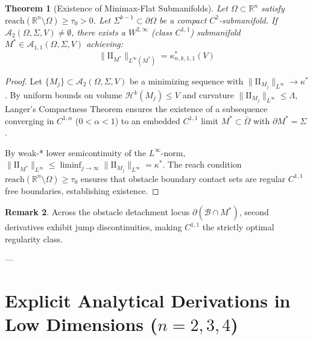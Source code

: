 \documentclass[11pt,reqno]{amsart}
\newtheorem{theorem}{Theorem}[section]
\theoremstyle{definition}
\newtheorem{remark}[theorem]{Remark}
\providecommand{\R}{\mathbb{R}}
\providecommand{\II}{\mathrm{I\!I}}
\newcommand{\reach}{\mathrm{reach}}
\providecommand{\Hsn}{\mathcal{H}}
\numberwithin{equation}{section}
\providecommand{\II}{\mathrm{II}}
\providecommand{\R}{\mathbb{R}}
\providecommand{\Hsn}{\mathcal{H}}
\begin{document}
\begin{theorem}[Existence of Minimax-Flat Submanifolds]
\label{thm:existence}
Let $\Omega \subset \R^n$ satisfy $\reach(\R^n \setminus \Omega) \ge \tau_0 > 0$. Let $\Sigma^{k-1} \subset \partial\Omega$ be a compact $C^2$-submanifold. If $\mathcal{A}_2(\Omega, \Sigma, V) \neq \emptyset$, there exists a $W^{2,\infty}$ (class $C^{1,1}$) submanifold $M^* \in \mathcal{A}_{1,1}(\Omega, \Sigma, V)$ achieving:
\begin{equation}
\|\II_{M^*}\|_{L^\infty(M^*)} = \kappa^*_{n,k,1,1}(V)
\end{equation}
\end{theorem}

\begin{proof}
Let $\{M_j\} \subset \mathcal{A}_2(\Omega, \Sigma, V)$ be a minimizing sequence with $\|\II_{M_j}\|_{L^\infty} \to \kappa^*$. By uniform bounds on volume $\Hsn^k(M_j) \le V$ and curvature $\|\II_{M_j}\|_{L^\infty} \le \Lambda$, Langer's Compactness Theorem \cite{langer1985} ensures the existence of a subsequence converging in $C^{1,\alpha}$ ($0 < \alpha < 1$) to an embedded $C^{1,1}$ limit $M^* \subset \bar{\Omega}$ with $\partial M^* = \Sigma$.

By weak-* lower semicontinuity of the $L^\infty$-norm, $\|\II_{M^*}\|_{L^\infty} \le \liminf_{j \to \infty} \|\II_{M_j}\|_{L^\infty} = \kappa^*$. The reach condition $\reach(\R^n \setminus \Omega) \ge \tau_0$ ensures that obstacle boundary contact sets are regular $C^{1,1}$ free boundaries, establishing existence.
\end{proof}

\begin{remark}
Across the obstacle detachment locus $\partial(\mathcal{B} \cap M^*)$, second derivatives exhibit jump discontinuities, making $C^{1,1}$ the strictly optimal regularity class.
\end{remark}

---

\section[Analytical Derivations in Low Dimensions]{Explicit Analytical Derivations in Low Dimensions \texorpdfstring{($n=2, 3, 4$)}{(n=2, 3, 4)}}
\end{document}
